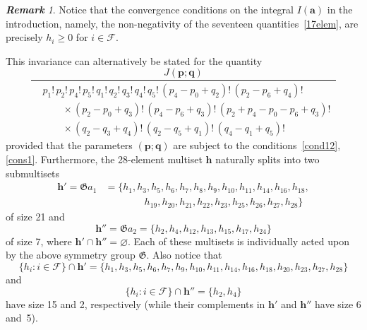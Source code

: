 \documentclass[12pt,reqno]{amsart}
\theoremstyle{remark}
\newtheorem{remark}{\bf Remark}
\let\emptyset\varnothing
\newcommand\ba{\boldsymbol a}
\newcommand\bh{\boldsymbol h}
\newcommand\bp{\boldsymbol p}
\newcommand\bq{\boldsymbol q}
\newcommand\cF{\mathcal F}
\newcommand\frG{\mathfrak G}
\begin{document}
\begin{remark}
\label{rem17}
Notice that the convergence conditions on the integral $I(\ba)$ in the introduction, namely, the non-negativity of the seventeen quantities~\eqref{17elem}, are precisely $h_i\ge0$ for $i\in\cF$.
\end{remark}

This invariance can alternatively be stated for the quantity
\[
\frac{J(\bp;\bq)}{\begin{aligned}
& p_1!\,p_2!\,p_4!\,p_5!\,q_1!\,q_2!\,q_3!\,q_4!\,q_5!\,(p_4-p_0+q_2)!\,(p_2-p_6+q_4)!\,
\\[-1.5mm] &\qquad\times (p_2-p_0+q_3)!\,(p_4-p_6+q_3)!\,(p_2+p_4-p_0-p_6+q_3)!\,
\\[-1.5mm] &\qquad\times (q_2-q_3+q_4)!\,(q_2-q_5+q_1)!\,(q_4-q_1+q_5)!
\end{aligned}}
\]
provided that the parameters $(\bp;\bq)$ are subject to the conditions~\eqref{cond12}, \eqref{cons1}.
Furthermore, the 28-element multiset $\bh$ naturally splits into two submultisets
\begin{align*}
\bh'=\frG a_1
&=\{h_1,h_3,h_5,h_6,h_7,h_8,h_9,h_{10},h_{11},h_{14},h_{16},h_{18},
\\ &\qquad\qquad
h_{19},h_{20},h_{21},h_{22},h_{23},h_{25},h_{26},h_{27},h_{28}\}
\end{align*}
of size 21 and
\[
\bh''=\frG a_2
=\{h_2,h_4,h_{12},h_{13},h_{15},h_{17},h_{24}\}
\]
of size 7,  where $\bh'\cap\bh''=\emptyset$. Each of these multisets  is individually acted  upon by the above symmetry group $\frG$. Also notice that
\[
\{h_i:i\in\cF\}\cap\bh'=\{h_1,h_3,h_5,h_6,h_7,h_9,h_{10},h_{11},h_{14},h_{16},h_{18},h_{20},h_{23},h_{27},h_{28}\}
\]
and
\[
\{h_i:i\in\cF\}\cap\bh''=\{h_2,h_4\}
\]
have size 15 and 2, respectively (while their complements in $\bh'$ and $\bh''$ have size 6 and~5).
\end{document}

